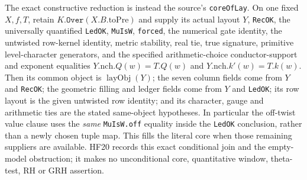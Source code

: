 The exact constructive reduction is instead
the source's \texttt{coreOfLay}. On one fixed
$X,f,T$, retain $K.\texttt{Over}(X.B.\mathrm{toPre})$
and supply its actual layout $Y$,
\texttt{RecOK}, the universally quantified
\texttt{LedOK}, \texttt{MuIsW}, \texttt{forced},
the numerical gate identity, the untwisted
row-kernel identity, metric stability, real
tie, true signature, primitive level-character
generators, and the specified arithmetic-choice
conductor-support and exponent equalities
$Y.\mathrm{nch}.Q(w)=T.Q(w)$ and
$Y.\mathrm{nch}.k'(w)=T.k(w)$. Then its common object
is $\operatorname{layObj}(Y)$; the seven column
fields come from $Y$ and \texttt{RecOK}; the
geometric filling and ledger fields come from
$Y$ and \texttt{LedOK}; its row layout is the
given untwisted row identity; and its character,
gauge and arithmetic ties are the stated
same-object hypotheses. In particular the
off-twist value clause uses the \emph{same}
\texttt{MuIsW.off} equality inside the
\texttt{LedOK} conclusion, rather than a
newly chosen tuple map. This fills the literal
core when those remaining suppliers are
available. HF20 records this exact conditional
join and the empty-model obstruction; it makes
no unconditional core, quantitative window,
theta-test, RH or GRH assertion.

